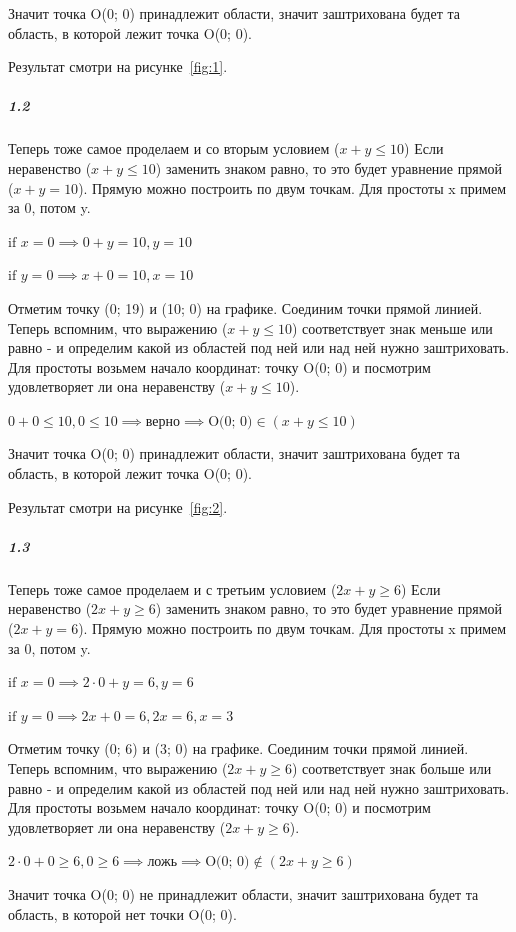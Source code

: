 Значит точка O(0; 0) принадлежит области, значит заштрихована будет та область, в которой лежит точка O(0; 0).

Результат смотри на рисунке~\ref{fig:1}.


\subparagraph{1.2}
Теперь тоже самое проделаем и со вторым условием ($x+y \leq 10$)
Если неравенство ($x+y \leq 10$) заменить знаком равно, то это будет уравнение прямой ($x+y = 10$).
Прямую можно построить по двум точкам.
Для простоты x примем за 0, потом y.

$
\text{if } x = 0 \implies 0+y=10, y=10
$

$
\text{if } y = 0 \implies x+0=10, x=10
$

Отметим точку (0; 19) и (10; 0) на графике.
Соединим точки прямой линией.
Теперь вспомним, что выражению ($x+y \leq 10$) соответствует знак меньше или равно
- и определим какой из областей под ней или над ней нужно заштриховать.
Для простоты возьмем начало координат: точку O(0; 0)
и посмотрим удовлетворяет ли она неравенству ($x+y \leq 10$).

$
0+0 \leq 10, 0 \leq 10 \implies \text{верно} \implies \text{O(0; 0)} \in (x+y\leq 10)
$

Значит точка O(0; 0) принадлежит области, значит заштрихована будет та область, в которой лежит точка O(0; 0).

Результат смотри на рисунке~\ref{fig:2}.

\subparagraph{1.3}
Теперь тоже самое проделаем и с третьим условием ($2x+y \geq 6$)
Если неравенство ($2x+y \geq 6$) заменить знаком равно, то это будет уравнение прямой ($2x+y = 6$).
Прямую можно построить по двум точкам.
Для простоты x примем за 0, потом y.

$
\text{if } x = 0 \implies 2\cdot0+y=6, y=6
$

$
\text{if } y = 0 \implies 2x+0=6, 2x=6, x=3
$

Отметим точку (0; 6) и (3; 0) на графике.
Соединим точки прямой линией.
Теперь вспомним, что выражению ($2x+y \geq 6$) соответствует знак больше или равно
- и определим какой из областей под ней или над ней нужно заштриховать.
Для простоты возьмем начало координат: точку O(0; 0)
и посмотрим удовлетворяет ли она неравенству ($2x+y \geq 6$).

$
2\cdot0+0 \geq 6, 0 \geq 6 \implies \text{ложь} \implies \text{O(0; 0)} \notin (2x+y \geq 6)
$

Значит точка O(0; 0) не принадлежит области, значит заштрихована будет та область, в которой нет точки O(0; 0).

